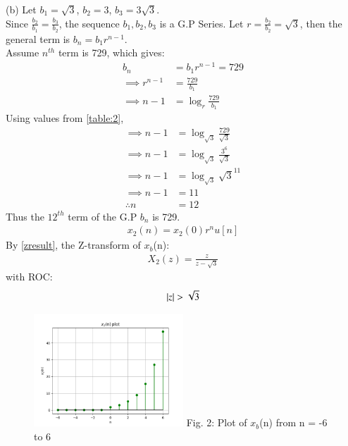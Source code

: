 \documentclass[journal,12pt,twocolumn]{IEEEtran}
\theoremstyle{remark}
\begin{document}


(b) Let $b_1 = \sqrt{3}$, $b_2 = 3$, $b_3 = 3\sqrt{3}$.\\
Since $\frac{b_2}{b_1} = \frac{b_3}{b_2}$, the sequence $b_1, b_2, b_3$ is a G.P Series.
Let $r = \frac{b_2}{b_2} = \sqrt{3}$, then the general term is $b_n = b_1 r^{n-1}$.\\
Assume $n^{th}$ term is 729, which gives: 
\begin{align}
    b_n &= b_1 r^{n-1} = 729\\
    \implies r^{n-1} &= \frac{729}{b_1}\\
    \implies n - 1 &= \log_{r}{\frac{729}{b_1}}
\end{align}
Using values from \ref{table:2},
\begin{align}
    \implies n - 1 &= \log_{\sqrt{3}}{\frac{729}{\sqrt{3}}}\\
    \implies n - 1 &= \log_{\sqrt{3}}{\frac{3^6}{\sqrt{3}}}\\
    \implies n - 1 &= \log_{\sqrt{3}}{\sqrt{3}^{11}}\\
    \implies n - 1 &= 11\\
    \therefore n &= 12
\end{align}
Thus the $12^{th}$ term of the G.P $b_n$ is 729.
\begin{align}  x_2(n) = x_2(0)r^nu[n]  \end{align}
By \ref{zresult}, the Z-transform of $x_b$(n):
\begin{align} X_2(z) = \frac{z}{z - \sqrt{3}} \end{align}
with ROC: \[ \left\vert z\right\vert > \sqrt{3} \]
\begin{figure}[h!]
    \centering
    \includegraphics[width=0.5\textwidth]{figs/b.png}
    Fig. 2: Plot of $x_b$(n) from n = -6 to 6
    \label{fig:img2}
\end{figure}


\end{document}
